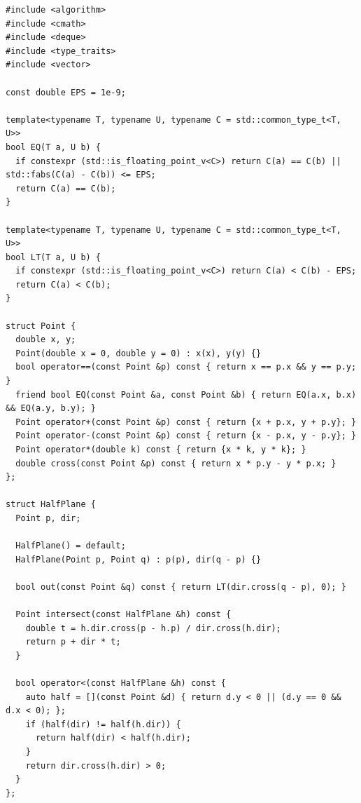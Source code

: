 \begin{lstlisting}[style=cpp]
#include <algorithm>
#include <cmath>
#include <deque>
#include <type_traits>
#include <vector>

const double EPS = 1e-9;

template<typename T, typename U, typename C = std::common_type_t<T, U>>
bool EQ(T a, U b) {
  if constexpr (std::is_floating_point_v<C>) return C(a) == C(b) || std::fabs(C(a) - C(b)) <= EPS;
  return C(a) == C(b);
}

template<typename T, typename U, typename C = std::common_type_t<T, U>>
bool LT(T a, U b) {
  if constexpr (std::is_floating_point_v<C>) return C(a) < C(b) - EPS;
  return C(a) < C(b);
}

struct Point {
  double x, y;
  Point(double x = 0, double y = 0) : x(x), y(y) {}
  bool operator==(const Point &p) const { return x == p.x && y == p.y; }
  friend bool EQ(const Point &a, const Point &b) { return EQ(a.x, b.x) && EQ(a.y, b.y); }
  Point operator+(const Point &p) const { return {x + p.x, y + p.y}; }
  Point operator-(const Point &p) const { return {x - p.x, y - p.y}; }
  Point operator*(double k) const { return {x * k, y * k}; }
  double cross(const Point &p) const { return x * p.y - y * p.x; }
};

struct HalfPlane {
  Point p, dir;

  HalfPlane() = default;
  HalfPlane(Point p, Point q) : p(p), dir(q - p) {}

  bool out(const Point &q) const { return LT(dir.cross(q - p), 0); }

  Point intersect(const HalfPlane &h) const {
    double t = h.dir.cross(p - h.p) / dir.cross(h.dir);
    return p + dir * t;
  }

  bool operator<(const HalfPlane &h) const {
    auto half = [](const Point &d) { return d.y < 0 || (d.y == 0 && d.x < 0); };
    if (half(dir) != half(h.dir)) {
      return half(dir) < half(h.dir);
    }
    return dir.cross(h.dir) > 0;
  }
};


\end{lstlisting}

